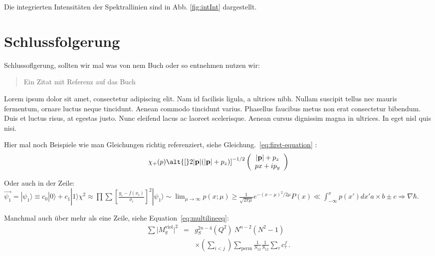 \documentclass[aps,twocolumn,secnumarabic,nobalancelastpage,amsmath,amssymb,
nofootinbib,superscriptaddress]{revtex4-1}
\begin{document}
Die integrierten Intensitäten der Spektrallinien sind in Abb. \ref{fig:intInt} dargestellt.


\section{Schlussfolgerung}

Schlussoflgerung, sollten wir mal was von nem Buch oder so entnehmen nutzen wir:


\begin{quote}
  Ein Zitat mit Referenz auf das Buch \cite{melissinos1966}
\end{quote}

Lorem ipsum dolor sit amet, consectetur adipiscing elit. Nam id facilisis ligula,
a ultrices nibh. Nullam suscipit tellus nec mauris fermentum, ornare luctus neque
tincidunt. Aenean commodo tincidunt varius. Phasellus faucibus metus non erat
consectetur bibendum. Duis et luctus risus, at egestas justo. Nunc eleifend lacus
ac laoreet scelerisque. Aenean cursus dignissim magna in ultrices. In eget nisl
quis nisi.

Hier mal noch Beispiele wie man Gleichungen richtig referenziert, siehe
Gleichung.~\ref{eq:first-equation} :
\begin{equation}
   \chi_+(p)\alt{\bf [}2|{\bf p}|(|{\bf p}|+p_z){\bf ]}^{-1/2}
   \left(
   \begin{array}{c}
      |{\bf p}|+p_z\\
      px+ip_y
   \end{array}\right)
   \label{eq:first-equation}
\end{equation}


Oder auch in der Zeile: $\vec{\psi_1} = |\psi_1\rangle \equiv c_0|0\rangle +
c_1|1\rangle \chi^2 \approx
\prod\sum\left[\frac{y_i-f(x_i)}{\sigma_i}\right]^2 |\psi_1\rangle
\sim \lim_{\mu \rightarrow \infty}p(x;\mu) \geq \frac{1}{\sqrt{2 \pi
\mu}} e^{-(x-\mu)^2 / 2\mu}P(x) \ll \int_{-\infty}^x p(x')dx'a
\times b \pm c \Rightarrow \nabla \hbar$.

Manchmal auch über mehr als eine Zeile, siehe Equation~\ref{eq:multilineeq}:
\begin{eqnarray}
  \sum \vert M^{\text{viol}}_g \vert ^2
   &=&  g^{2n-4}_S(Q^2)~N^{n-2} (N^2-1)
\nonumber
\\
   &&   \times \left( \sum_{i<j}\right) \sum_{\text{perm}}
            \frac{1}{S_{12}}  \frac{1}{S_{12}} \sum_\tau c^f_\tau
\,.
\label{eq:multilineeq}
\end{eqnarray}
\end{document}
